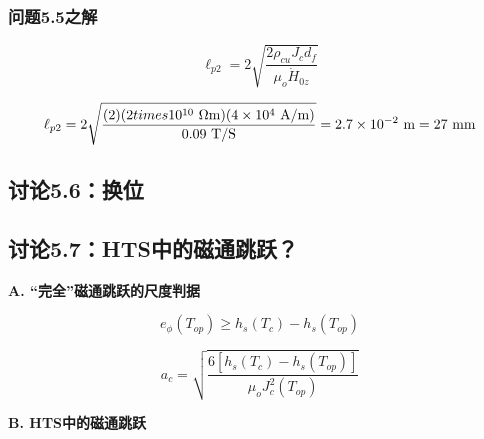\subsubsection{问题5.5之解}

\begin{equation}%
\ell_{p2}=2\sqrt{\frac{2\rho_{cu}J_{c}d_{f}}{\mu_{o}\dot{H}_{0z}}}
\end{equation}


\begin{equation}%
\ell_{p2}=2\sqrt{\frac{(2)(2\\times 10^{10}\ \mathrm{\Omega m})(4\times 10^{4}\ \mathrm{A/m})}{0.09\ \mathrm{T/S}}}\\
=2.7\times 10^{-2}\ \mathrm{m}=27\ \mathrm{mm}
\end{equation}


\subsection{讨论5.6：换位}




\subsection{讨论5.7：HTS中的磁通跳跃？}

\textbf{A. “完全”磁通跳跃的尺度判据}

\begin{equation}%
e_{\phi}(T_{op})\geq h_{s}(T_{c})-h_{s}(T_{op})
\end{equation}


\begin{equation}%
a_{c}=\sqrt{\frac{6[h_{s}(T_{c})-h_{s}(T_{op})]}{\mu_{o}J_{c}^{2}(T_{op})}}
\end{equation}

\textbf{B. HTS中的磁通跳跃}


